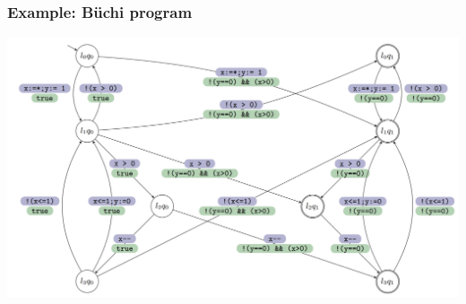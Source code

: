 \documentclass[xcolor=dvipsnames]{beamer}
\begin{document}
\begin{frame}
    \frametitle{Example: Büchi program}
    \includegraphics[width=\textwidth,height=\textheight,keepaspectratio]{product.jpg} \\
\end{frame}
\end{document}
